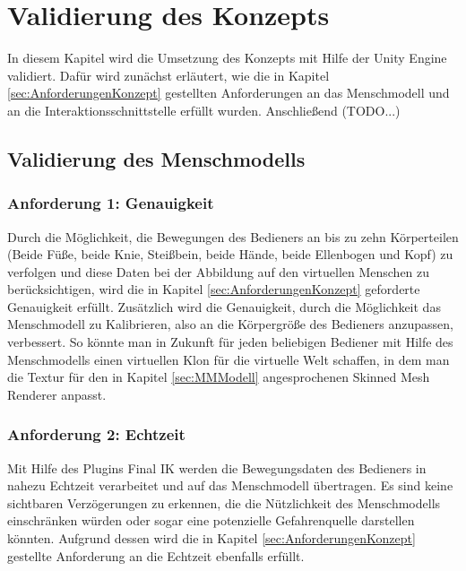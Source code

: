 \chapter{Validierung des Konzepts}\label{cha:ValidierungDesKonzepts}
In diesem Kapitel wird die Umsetzung des Konzepts mit Hilfe der Unity Engine validiert. Dafür wird zunächst erläutert, wie die in Kapitel \ref{sec:AnforderungenKonzept} gestellten Anforderungen an das Menschmodell und an die Interaktionsschnittstelle erfüllt wurden. Anschließend (TODO...)
\section{Validierung des Menschmodells}\label{sec:ValidMensch}

\subsection{Anforderung 1: Genauigkeit}
Durch die Möglichkeit, die Bewegungen des Bedieners an bis zu zehn Körperteilen (Beide Füße, beide Knie, Steißbein, beide Hände, beide Ellenbogen und Kopf) zu verfolgen und diese Daten bei der Abbildung auf den virtuellen Menschen zu berücksichtigen, wird die in Kapitel \ref{sec:AnforderungenKonzept} geforderte Genauigkeit erfüllt. Zusätzlich wird die Genauigkeit, durch die Möglichkeit das Menschmodell zu Kalibrieren, also an die Körpergröße des Bedieners anzupassen, verbessert. So könnte man in Zukunft für jeden beliebigen Bediener mit Hilfe des Menschmodells einen virtuellen Klon für die virtuelle Welt schaffen, in dem man die Textur für den in Kapitel \ref{sec:MMModell} angesprochenen Skinned Mesh Renderer anpasst.

\subsection{Anforderung 2: Echtzeit}
Mit Hilfe des Plugins Final IK werden die Bewegungsdaten des Bedieners in nahezu Echtzeit verarbeitet und auf das Menschmodell übertragen. Es sind keine sichtbaren Verzögerungen zu erkennen, die die Nützlichkeit des Menschmodells einschränken würden oder sogar eine potenzielle Gefahrenquelle darstellen könnten. Aufgrund dessen wird die in Kapitel \ref{sec:AnforderungenKonzept} gestellte Anforderung an die Echtzeit ebenfalls erfüllt.

